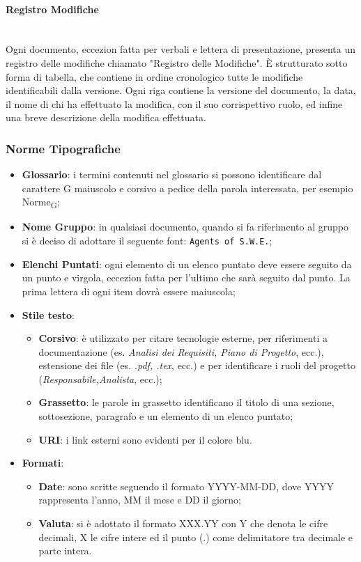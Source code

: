 \paragraph{Registro Modifiche} \-\\
Ogni documento, eccezion fatta per verbali e lettera di presentazione, presenta un registro delle modifiche chiamato "Registro delle Modifiche". È strutturato sotto forma di tabella, che contiene in ordine cronologico tutte le modifiche identificabili dalla versione.  Ogni riga contiene la versione del documento, la data, il nome di chi ha effettuato la modifica, con il suo corrispettivo ruolo, ed infine una breve descrizione della modifica effettuata.


\subsubsection{Norme Tipografiche}
\begin{itemize}
	\item \textbf{Glossario}: i termini contenuti nel glossario si possono identificare dal carattere G maiuscolo e corsivo a pedice della parola interessata, per esempio Norme\textsubscript{G};	 		
	\item \textbf{Nome Gruppo}: in qualsiasi documento, quando si fa riferimento al gruppo si è deciso di adottare il seguente font: \texttt{Agents of S.W.E.};
	\item \textbf{Elenchi Puntati}: ogni elemento di un elenco puntato deve essere seguito da un punto e virgola, eccezion fatta per l'ultimo che sarà seguito dal punto. La prima lettera di ogni item dovrà essere maiuscola;
	\item \textbf{Stile testo}:
	\begin{itemize}
		\item \textbf{Corsivo}: è utilizzato per citare tecnologie esterne, per riferimenti a documentazione (es. \textit{Analisi dei Requisiti, Piano di Progetto}, ecc.), estensione dei file (es. \textit{.pdf, .tex}, ecc.) e per identificare i ruoli del progetto (\textit{Responsabile,Analista}, ecc.);	
		\item \textbf{Grassetto}: le parole in grassetto identificano il titolo di una sezione, sottosezione, paragrafo e un elemento di un elenco puntato;
		\item \textbf{URI}:	i link esterni sono evidenti per il colore blu.
	\end{itemize}
	\item \textbf{Formati}:
	\begin{itemize}
		\item \textbf{Date}: sono scritte seguendo il formato YYYY-MM-DD, dove YYYY rappresenta l'anno, MM il mese e DD il giorno;
		\item \textbf{Valuta}: si è adottato il formato XXX.YY con Y che denota le cifre decimali, X le cifre intere ed il punto (.) come delimitatore tra decimale e parte intera.
	\end{itemize}
\end{itemize}


